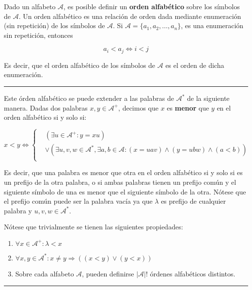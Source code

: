 Dado un alfabeto \(\mathcal{A}\), es posible definir un \textbf{orden
alfabético} sobre los símbolos de \(\mathcal{A}\). Un orden alfabético
es una relación de orden dada mediante enumeración (sin repetición) de
los símbolos de \(\mathcal{A}\). Si
\(\mathcal{A}=\{a_1,a_2,\dots,a_n\}\), es una enumeración sin
repetición, entonces

\[
a_i < a_j \Leftrightarrow i < j
\]

Es decir, que el orden alfabético de los símbolos de \(\mathcal{A}\) es
el orden de dicha enumeración.

\begin{center}\rule{0.5\linewidth}{0.5pt}\end{center}

Este órden alfabético se puede extender a las palabras de
\(\mathcal{A}^*\) de la siguiente manera. Dadas dos palabras
\(x,y\in\mathcal{A}^+\), decimos que \(x\) es \textbf{menor} que \(y\)
en el orden alfabético si y solo si:

\[
x < y \Leftrightarrow\begin{cases}
& \left(\exists u\in\mathcal{A}^+:y=xu\right)\\
& \vee\left(\exists u,v,w\in\mathcal{A}^*, \exists a,b\in\mathcal{A}:(x=uav
)\wedge (y=ubw) \wedge (a<b)\right)\\
\end{cases}
\]

Es decir, que una palabra es menor que otra en el orden alfabético si y
solo si es un prefijo de la otra palabra, o si ambas palabras tienen un
prefijo común y el siguiente símbolo de una es menor que el siguiente
símbolo de la otra. Nótese que el prefijo común puede ser la palabra
vacía ya que \(\lambda\) es prefijo de cualquier palabra y
\(u,v,w\in\mathcal{A}^*\).

Nótese que trivialmente se tienen las siguientes propiedades:

\begin{enumerate}
\def\labelenumi{\arabic{enumi}.}
\tightlist
\item
  \(\forall x\in\mathcal{A}^+:\lambda < x\)
\item
  \(\forall x,y\in\mathcal{A}^*:x\neq y \Rightarrow ((x<y)\vee(y<x))\)
\item
  Sobre cada alfabeto \(\mathcal{A}\), pueden definirse
  \(\left|\mathcal{A}\right|!\) órdenes alfabéticos distintos.
\end{enumerate}

\begin{center}\rule{0.5\linewidth}{0.5pt}\end{center}

